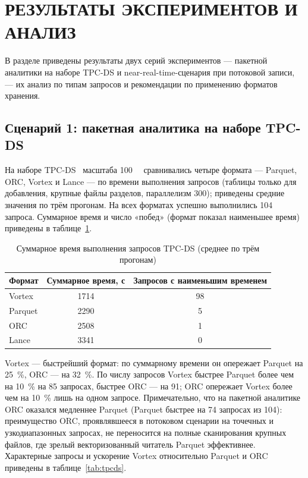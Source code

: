 \section{РЕЗУЛЬТАТЫ ЭКСПЕРИМЕНТОВ И АНАЛИЗ}

В разделе приведены результаты двух серий экспериментов --- пакетной аналитики на
наборе TPC-DS и near-real-time-сценария при потоковой записи, --- их анализ по типам
запросов и рекомендации по применению форматов хранения.

\subsection{Сценарий 1: пакетная аналитика на наборе TPC-DS}

На наборе TPC-DS~\cite{tpcds-spec} масштаба \SI{100}{\giga\byte} сравнивались
четыре формата --- Parquet, ORC, Vortex и Lance --- по времени выполнения запросов
(таблицы только для добавления, крупные файлы разделов, параллелизм 300); приведены
средние значения по трём прогонам. На всех форматах успешно выполнились
\num{104} запроса. Суммарное время и число «побед» (формат показал наименьшее время)
приведены в таблице~\ref{tab:tpcds-total}.

\begin{table}
    \caption{Суммарное время выполнения запросов TPC-DS (среднее по трём прогонам)}
    \label{tab:tpcds-total}
    \begin{tabularx}{\textwidth}{|X|c|c|}\hline
    \textbf{Формат} & \textbf{Суммарное время, с} & \textbf{Запросов с наименьшим временем} \\ \hline
    Vortex  & 1714 & 98 \\ \hline
    Parquet & 2290 & 5 \\ \hline
    ORC     & 2508 & 1 \\ \hline
    Lance   & 3341 & 0 \\ \hline
    \end{tabularx}
\end{table}

Vortex --- быстрейший формат: по суммарному времени он опережает Parquet на
\SI{25}{\percent}, ORC --- на \SI{32}{\percent}. По числу запросов Vortex быстрее
Parquet более чем на \SI{10}{\percent} на \num{85} запросах, быстрее ORC --- на
\num{91}; ORC опережает Vortex более чем на \SI{10}{\percent} лишь на одном запросе.
Примечательно, что на пакетной аналитике ORC оказался медленнее Parquet
(Parquet быстрее на \num{74} запросах из \num{104}): преимущество ORC, проявлявшееся
в потоковом сценарии на точечных и узкодиапазонных запросах, не переносится на
полные сканирования крупных файлов, где зрелый векторизованный читатель Parquet
эффективнее. Характерные запросы и ускорение Vortex относительно Parquet и ORC
приведены в таблице~\ref{tab:tpcds}.

